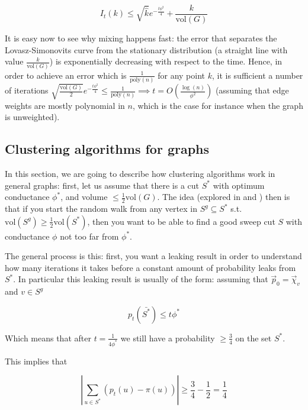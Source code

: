 \documentclass[../main.tex]{subfiles}
\begin{document}
    \begin{equation}
        I_t(k) \leq \sqrt{\hat{k}} e^{-\frac{t\phi^2}{4}} + \frac{k}{\text{vol}(G)}
    \end{equation}
    
    It is easy now to see why mixing happens fast: the error that separates the Lovasz-Simonovits curve from the stationary distribution (a straight line with value $\frac{k}{\text{vol}(G)}$) is exponentially decreasing with respect to the time. Hence, in order to achieve an error which is $\frac{1}{\text{poly}(n)}$ for any point $k$, it is sufficient a number of iterations $\sqrt{\frac{\text{vol}(G)}{2}} e^{-\frac{t\phi^2}{4}} \leq \frac{1}{\text{poly}(n)} \implies t = O\left(\frac{\log(n)}{\phi^2}\right)$ (assuming that edge weights are mostly polynomial in $n$, which is the case for instance when the graph is unweighted). 

\subsection{Clustering algorithms for graphs}
\label{subsec:definitions_clustering_algorithm}
    
    In this section, we are going to describe how clustering algorithms work in general graphs: first, let us assume that there is a cut $S^*$ with optimum conductance $\phi^*$, and volume $\leq \frac{1}{2}\text{vol}(G)$. The idea (explored in \cite{SpielmanClustering} and \cite{AndersenPPRClustering}) then is that if you start the random walk from any vertex in $S^g \subseteq S^*$ s.t. $\text{vol}(S^g) \geq \frac{1}{2}\text{vol}(S^*)$, then you want to be able to find a good sweep cut $S$ with conductance $\phi$ not too far from $\phi^*$. 
    
    The general process is this: first, you want a leaking result in order to understand how many iterations it takes before a constant amount of probability leaks from $S^*$. In particular this leaking result is usually of the form: assuming that $\vec{p}_0 = \vec{\chi}_v$ and $v\in S^g$
    
    \begin{equation}
        p_t(\bar{S^*}) \leq t \phi^*
    \end{equation}
    
    Which means that after $t = \frac{1}{4\phi^*}$ we still have a probability $\geq \frac{3}{4}$ on the set $S^*$.
    
    This implies that 
    
    \begin{equation}
        \left|\sum_{u\in S^*} (p_t(u) - \pi(u))\right|  \geq \frac{3}{4} - \frac{1}{2} = \frac{1}{4}
    \end{equation}
    
\end{document}
